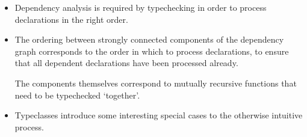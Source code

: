 \documentclass[dissertation.tex]{subfiles}
\begin{document}
{{        \begin{itemize}
        \item Dependency analysis is required by typechecking in order to process declarations in the right order.
        \item
        {

            The ordering between strongly connected components of the dependency graph corresponds to the order in which
            to process declarations, to ensure that all dependent declarations have been processed already.
            
            The components themselves correspond to mutually recursive functions that need to be typechecked `together'.

        }
        \item Typeclasses introduce some interesting special cases to the otherwise intuitive process.
        \end{itemize}
    }
}
\end{document}
